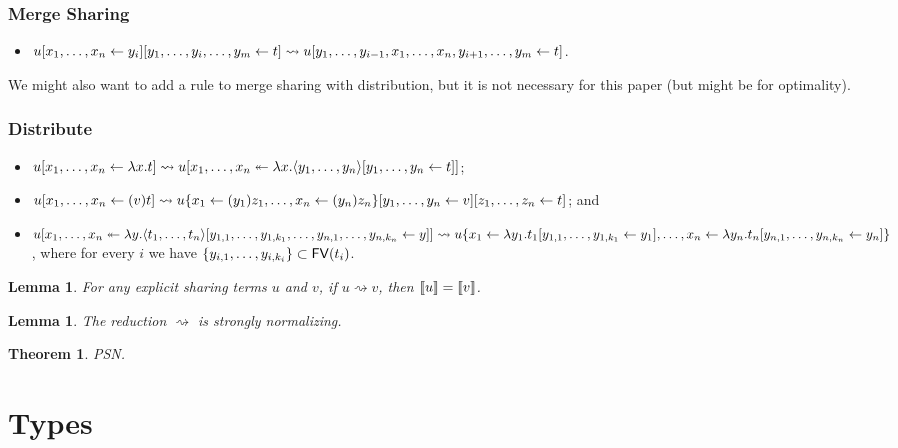 \documentclass[11pt,a4paper]{article}
\theoremstyle{definition}
\theoremstyle{plain}
\newtheorem{lemma}[definition]{Lemma}
\newtheorem{theorem}[definition]{Theorem}
\theoremstyle{remark}
\begin{document}
\subsubsection{Merge Sharing}

\begin{itemize}
 \item ${ {{ { {u}[{{x_1},\dots,{x_n}}\leftarrow{y_i}] } }}[{y_1,\dots,y_i,\dots,y_m}\leftarrow{t}] }\rightsquigarrow
	{ {u}[{y_1,\dots,y_{i-1},x_1,\dots,x_n,y_{i+1},\dots,y_m}\leftarrow{t}] }$.
\end{itemize}

We might also want to add a rule to merge sharing with distribution, but it is not necessary for this paper (but might be for optimality).

\subsubsection{Distribute}

\begin{itemize}
 \item ${ { {u}[{{x_1},\dots,{x_n}}\leftarrow{\lambda x.t}] } } \rightsquigarrow {  { {u}[{{x_1},\dots,{x_n}}\twoheadleftarrow{\lambda{x}.{ {  { { { {\langle} {y_1},\dots,{y_n} {\rangle} } }[{{y_1},\dots,{y_n}}\leftarrow{t}] }  } }}] }  }$;
 \item ${ { {u}[{{x_1},\dots,{x_n}}\leftarrow{(v)t}] } } \rightsquigarrow {  { { {  { {{{u}\{{x_1}\leftarrow{(y_1)z_1},\dots,{x_n}\leftarrow{(y_n)z_n}\}}}[{{y_1},\dots,{y_n}}\leftarrow{v}] }  } }[{{z_1},\dots,{z_n}}\leftarrow{t}] }  }$; and
 \item ${ { {u}[{{x_1},\dots,{x_n}}\twoheadleftarrow{\lambda{y}.{ { { { {\langle} {t_1},\dots,{t_n} {\rangle} } }[{y_{1,1},\dots,y_{1,k_1},\dots,y_{n,1},\dots,y_{n,k_n}}\leftarrow{y}] } }}] } }\rightsquigarrow {{u}\{{x_1}\leftarrow{\lambda y_1. {  { {t_1}[{{y_{1,1}},\dots,{y_{1,k_1}}}\leftarrow{y_1}] }  } },\dots,{x_n}\leftarrow{\lambda y_n. {  { {t_n}[{{y_{n,1}},\dots,{y_{n,k_n}}}\leftarrow{y_n}] }  } }\}}$, where for every $i$ we have $\{y_{i,1},\dots,y_{i,k_i}\}\subset{\mathop{\mathsf{FV}}}(t_i)$.
\end{itemize}

\begin{lemma}
For any explicit sharing terms $u$ and $v$, if $u\rightsquigarrow v$, then ${\llbracket{u}\rrbracket}={\llbracket{v}\rrbracket}$.
\end{lemma}

\begin{lemma}
The reduction $\rightsquigarrow$ is strongly normalizing.
\end{lemma}

\begin{theorem}
PSN.
\end{theorem}

\section{Types}
\end{document}
